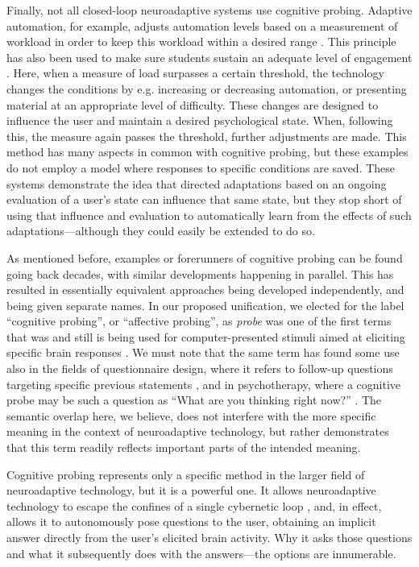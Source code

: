 Finally, not all closed-loop neuroadaptive systems \cite{krol2018interactivity} use cognitive probing. Adaptive automation, for example, adjusts automation levels based on a measurement of workload in order to keep this workload within a desired range \cite{byrne1996adaptiveauto}. This principle has also been used to make sure students sustain an adequate level of engagement \cite{yuksel2016bach}. Here, when a measure of load surpasses a certain threshold, the technology changes the conditions by e.g. increasing or decreasing automation, or presenting material at an appropriate level of difficulty. These changes are designed to influence the user and maintain a desired psychological state. When, following this, the measure again passes the threshold, further adjustments are made. This method has many aspects in common with cognitive probing, but these examples do not employ a model where responses to specific conditions are saved. These systems demonstrate the idea that directed adaptations based on an ongoing evaluation of a user's state can influence that same state, but they stop short of using that influence and evaluation to automatically learn from the effects of such adaptations---although they could easily be extended to do so.

As mentioned before, examples or forerunners of cognitive probing can be found going back decades, with similar developments happening in parallel. This has resulted in essentially equivalent approaches being developed independently, and being given separate names. In our proposed unification, we elected for the label ``cognitive probing'', or ``affective probing'', as \emph{probe} was one of the first terms that was and still is being used for computer-presented stimuli aimed at eliciting specific brain responses \cite{kane2000erpcoma,espie2007insomnia,lawrence2014}. We must note that the same term has found some use also in the fields of questionnaire design, where it refers to follow-up questions targeting specific previous statements \cite{beatty2007coginterview}, and in psychotherapy, where a cognitive probe may be such a question as ``What are you thinking right now?'' \cite{beck1991cognitivetherapy}. The semantic overlap here, we believe, does not interfere with the more specific meaning in the context of neuroadaptive technology, but rather demonstrates that this term readily reflects important parts of the intended meaning.

Cognitive probing represents only a specific method in the larger field of neuroadaptive technology, but it is a powerful one. It allows neuroadaptive technology to escape the confines of a single cybernetic loop \cite{pope1995biocybernetic}, and, in effect, allows it to autonomously pose questions to the user, obtaining an implicit answer directly from the user's elicited brain activity. Why it asks those questions and what it subsequently does with the answers---the options are innumerable.


